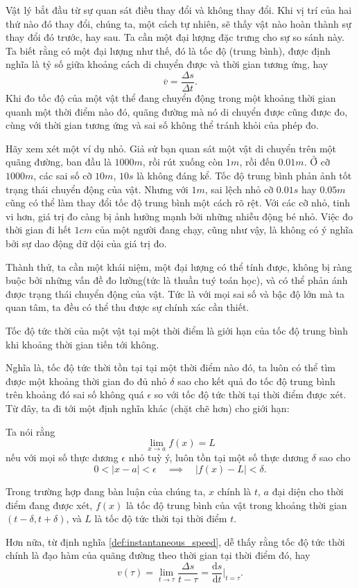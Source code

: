 Vật lý bắt đầu từ sự quan sát điều thay đổi và không thay đổi. Khi vị trí của hai thứ nào đó thay đổi, chúng ta, một cách tự nhiên, sẽ thấy vật nào hoàn thành sự thay đổi đó trước, hay sau. Ta cần một đại lượng đặc trưng cho sự so sánh này. Ta biết rằng có một đại lượng như thế, đó là tốc độ (trung bình), được định nghĩa là tỷ số giữa khoảng cách di chuyển được và thời gian tương ứng, hay
\[\overline{v}=\frac{\Delta s}{\Delta t}.\] 
Khi đo tốc độ của một vật thể đang chuyển động trong một khoảng thời gian quanh một thời điểm nào đó, quãng đường mà nó di chuyển được cũng được đo, cùng với thời gian tương ứng và sai số không thể tránh khỏi của phép đo.
\vspace{8pt}

Hãy xem xét một ví dụ nhỏ. Giả sử bạn quan sát một vật di chuyển trên một quãng đường, ban đầu là \(1000m\), rồi rút xuống còn \(1m\), rồi đến \(0.01m\). Ở cỡ \(1000m\), các sai số cỡ \(10m\), \(10s\) là không đáng kể. Tốc độ trung bình phản ảnh tốt trạng thái chuyển động của vật. Nhưng với \(1m\), sai lệch nhỏ cỡ \(0.01s\) hay \(0.05m\) cũng có thể làm thay đổi tốc độ trung bình một cách rõ rệt. Với các cỡ nhỏ, tinh vi hơn, giá trị đo càng bị ảnh hưởng mạnh bởi những nhiễu động bé nhỏ.
Việc đo thời gian đi hết \(1cm\) của một người đang chạy, cũng như vậy, là không có ý nghĩa bởi sự dao động dữ dội của giá trị đo.  
\vspace{8pt}

Thành thử, ta cần một khái niệm, một đại lượng có thể tính được, không bị ràng buộc bởi những vấn đề đo lường(tức là thuần tuý toán học), và có thể phản ánh được trạng thái chuyển động của vật. Tức là với mọi sai số và bậc độ lớn mà ta quan tâm, ta đều có thể thu được sự chính xác cần thiết. 
\begin{definition}\label{def:instantaneous_speed}
    Tốc độ tức thời của một vật tại một thời điểm là giới hạn của tốc độ trung bình khi khoảng thời gian tiến tới không.
\end{definition}
Nghĩa là, tốc độ tức thời tồn tại tại một thời điểm nào đó, ta luôn có thể tìm được một khoảng thời gian đo đủ nhỏ \(\delta\) sao cho kết quả đo tốc độ trung bình trên khoảng đó sai số không quá \(\epsilon\) so với tốc độ tức thời tại thời điểm được xét. Từ đây, ta đi tới một định nghĩa khác (chặt chẽ hơn) cho giới hạn:
\begin{definition}
    Ta nói rằng \[\lim_{x\rightarrow a}f(x)=L\] nếu với mọi số thực dương \(\epsilon\) nhỏ tuỳ ý, luôn tồn tại một số thực dương \(\delta\) sao cho 
    \[0<\lvert x-a\rvert <\epsilon \quad\implies \quad \lvert f(x)-L\rvert <\delta.\]
\end{definition}
Trong trường hợp đang bàn luận của chúng ta, \(x\) chính là \(t\), \(a\) đại diện cho thời điểm đang được xét, \(f(x)\) là tốc độ trung bình của vật trong khoảng thời gian \((t-\delta,t+\delta)\), và \(L\) là tốc độ tức thời tại thời điểm \(t\).
\vspace{8pt}

Hơn nữa, từ định nghĩa \ref{def:instantaneous_speed}, dễ thấy rằng tốc độ tức thời chính là đạo hàm của quãng đường theo thời gian tại thời điểm đó, hay 
\[v(\tau)=\lim_{t\rightarrow\tau}\frac{\Delta s}{t-\tau}=\frac{\text{d}s}{\text{d}t}\Big|_{t=\tau}.\]
